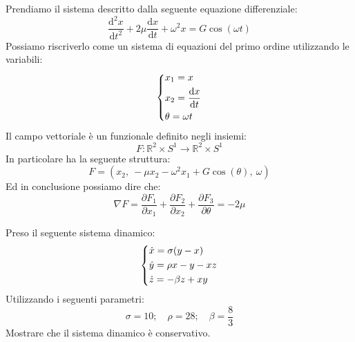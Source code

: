 \noindent
\begin{exmp}
    Prendiamo il sistema descritto dalla seguente equazione differenziale:
    \[
	\frac{\text{d} ^2x}{\text{d} t^2} + 2\mu\frac{\text{d} x}{\text{d} t} + \omega^2x = G\cos (\omega t)
    \] 
    Possiamo riscriverlo come un sistema di equazioni del primo ordine utilizzando le variabili:
    \[\begin{dcases}
        x_1 = x \\
	x_2 = \frac{\text{d} x}{\text{d} t} \\
	\theta  = \omega t
    \end{dcases}\] 
    Il campo vettoriale è un funzionale definito negli insiemi:
    \[
        F:\mathbb{R}^2 \times S^1 \to \mathbb{R}^2 \times S^1
    \] 
    In particolare ha la seguente struttura:
    \[
	F = (x_2, \ - \mu x_2 - \omega^2x_1 + G\cos(\theta), \ \omega)
    \] 
    Ed in conclusione possiamo dire che:
    \[
        \nabla F = \frac{\partial F_1}{\partial x_1}  + \frac{\partial F_2}{\partial x_2} + \frac{\partial F_3}{\partial \theta} = - 2\mu
    \] 
\end{exmp}
\noindent
\begin{exmp}
    Preso il seguente sistema dinamico:
    \[\begin{dcases}
	\dot{x}=\sigma (y-x)\\
	\dot{y}=\rho x- y - xz\\
	\dot{z}=- \beta z + xy
    \end{dcases}\] 
    Utilizzando i seguenti parametri:
    \[
        \sigma  = 10; \quad \rho  = 28; \quad \beta  = \frac{8}{3}
    \] 
    Mostrare che il sistema dinamico è conservativo.
\end{exmp}
\noindent
